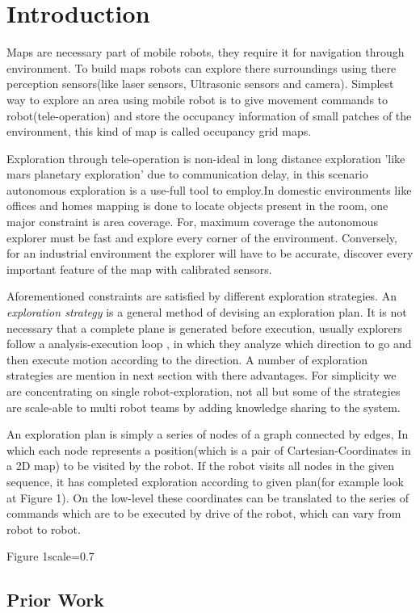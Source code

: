 \section{Introduction}
\label{sec:intro}
Maps are necessary part of mobile robots, they require it for navigation through environment. To build
maps robots can explore there surroundings using there perception sensors(like laser sensors,
Ultrasonic sensors and camera). Simplest way to explore an area using mobile robot is to give movement
commands to robot(tele-operation) and store the occupancy information of small patches of the environment,
this kind of map is called occupancy grid maps.
\par
Exploration through tele-operation is non-ideal in long distance exploration 'like mars planetary
exploration' due to communication delay, in this scenario autonomous exploration is a use-full
tool to employ.In domestic environments like offices and homes mapping is done to locate objects
present in the room, one major constraint is area coverage. For, maximum coverage the autonomous
explorer must be fast and explore every corner of the environment. Conversely, for an industrial
environment the explorer will have to be accurate, discover every important feature of the map with
calibrated sensors.
\par
Aforementioned constraints are satisfied by different exploration strategies. An \textit{exploration
strategy} is a general method of devising an exploration plan. It is not necessary that a complete
plane is generated before execution, usually explorers follow a analysis-execution loop , in which
they analyze which direction to go and then execute motion according to the direction. A number of
exploration strategies are mention in next section with there advantages. For simplicity we are
concentrating on single robot-exploration, not all but some of the strategies are scale-able to
multi robot teams by adding knowledge sharing to the system.
\par
An exploration plan is simply a series of nodes of a graph connected by edges,
In which each node represents a position(which is a pair of Cartesian-Coordinates in a 2D map)
to be visited by the robot. If the robot visits all nodes in the given sequence,
it has completed exploration according to given plan(for example look at Figure 1).
On the low-level these coordinates can be translated to the series of commands which are to be
executed by drive of the robot, which can vary from robot to robot.
\par

{Figure 1}{scale=0.7}

\subsection{Prior Work}
\label{sec:priorwork}
